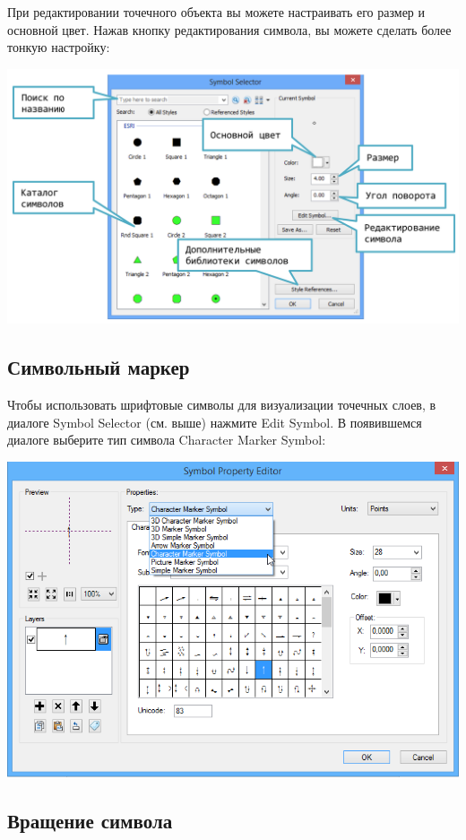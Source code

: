 \documentclass[]{book}
\theoremstyle{definition}
\theoremstyle{definition}
\theoremstyle{definition}
\theoremstyle{remark}
\begin{document}
При редактировании точечного объекта вы можете настраивать его размер и
основной цвет. Нажав кнопку редактирования символа, вы можете сделать
более тонкую настройку:

\includegraphics{images/Appendix/image25.png}

\hypertarget{-}{%
\subsection{Символьный маркер}\label{-}}

Чтобы использовать шрифтовые символы для визуализации точечных слоев, в
диалоге Symbol Selector (см. выше) нажмите Edit Symbol. В появившемся
диалоге выберите тип символа Character Marker Symbol:

\includegraphics{images/Appendix/image26.png}

\hypertarget{-}{%
\subsection{Вращение символа}\label{-}}
\end{document}
